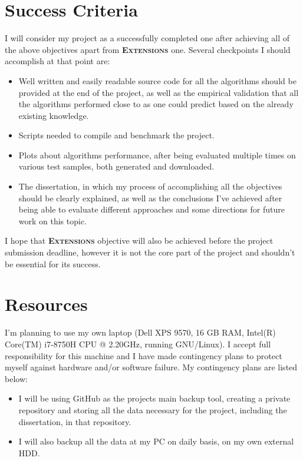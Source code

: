 \section*{Success Criteria}

I will consider my project as a successfully completed one after achieving all of the above objectives apart from \textbf{\textsc{Extensions}} one. Several checkpoints I should accomplish at that point are:
\begin{itemize}
    \item Well written and easily readable source code for all the algorithms should be provided at the end of the project, as well as the empirical validation that all the algorithms performed close to as one could predict based on the already existing knowledge.
    \item Scripts needed to compile and benchmark the project.
    \item Plots about algorithms performance, after being evaluated multiple times on various test samples, both generated and downloaded.
    \item The dissertation, in which my process of accomplishing all the objectives should be clearly explained, as well as the conclusions I've achieved after being able to evaluate different approaches and some directions for future work on this topic.
\end{itemize}
I hope that \textbf{\textsc{Extensions}} objective will also be achieved before the project submission deadline, however it is not the core part of the project and shouldn't be essential for its success.

\section*{Resources}

I'm planning to use my own laptop (Dell XPS 9570, 16 GB RAM, Intel(R) Core(TM) i7-8750H CPU @ 2.20GHz, running GNU/Linux).
I accept full responsibility for this machine and I have made contingency plans to protect myself against hardware and/or software failure.
My contingency plans are listed below:
\begin{itemize}
    \item I will be using GitHub as the projects main backup tool, creating a private repository and storing all the data necessary for the project, including the dissertation, in that repository.
    \item I will also backup all the data at my PC on daily basis, on my own external HDD.
\end{itemize}

